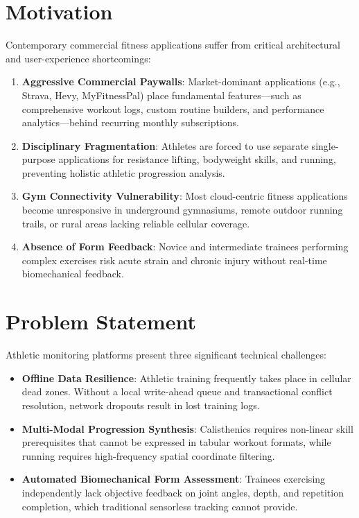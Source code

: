 \documentclass[12pt,a4paper]{report}
\begin{document}
\section{Motivation}
Contemporary commercial fitness applications suffer from critical architectural and user-experience shortcomings:
\begin{enumerate}
    \item \textbf{Aggressive Commercial Paywalls}: Market-dominant applications (e.g., Strava, Hevy, MyFitnessPal) place fundamental features---such as comprehensive workout logs, custom routine builders, and performance analytics---behind recurring monthly subscriptions.
    \item \textbf{Disciplinary Fragmentation}: Athletes are forced to use separate single-purpose applications for resistance lifting, bodyweight skills, and running, preventing holistic athletic progression analysis.
    \item \textbf{Gym Connectivity Vulnerability}: Most cloud-centric fitness applications become unresponsive in underground gymnasiums, remote outdoor running trails, or rural areas lacking reliable cellular coverage.
    \item \textbf{Absence of Form Feedback}: Novice and intermediate trainees performing complex exercises risk acute strain and chronic injury without real-time biomechanical feedback.
\end{enumerate}

\section{Problem Statement}
Athletic monitoring platforms present three significant technical challenges:
\begin{itemize}
    \item \textbf{Offline Data Resilience}: Athletic training frequently takes place in cellular dead zones. Without a local write-ahead queue and transactional conflict resolution, network dropouts result in lost training logs.
    \item \textbf{Multi-Modal Progression Synthesis}: Calisthenics requires non-linear skill prerequisites that cannot be expressed in tabular workout formats, while running requires high-frequency spatial coordinate filtering.
    \item \textbf{Automated Biomechanical Form Assessment}: Trainees exercising independently lack objective feedback on joint angles, depth, and repetition completion, which traditional sensorless tracking cannot provide.
\end{itemize}
\end{document}
